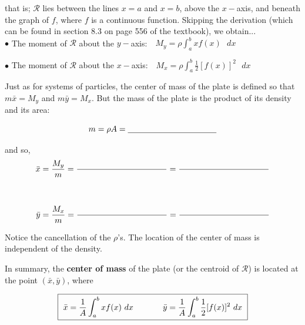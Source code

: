 \documentclass[paper=a4, fontsize=11pt]{scrartcl} %
\numberwithin{equation}{section} %
\numberwithin{figure}{section} %
\numberwithin{table}{section} %
\newcommand{\ds}{\displaystyle}
\begin{document}
that is; $\mathcal{R}$ lies between the lines $x=a$ and $x=b$, above the $x-$axis, and beneath the graph of $f$, where $f$ is a continuous function. Skipping the derivation (which can be found in section 8.3 on page 556 of the textbook), we obtain...\\

$\bullet$ The moment of $\mathcal{R}$ about the $y-$axis: \quad $\boxed{\text{ }M_y = \rho\ds\int_a^b x f(x) \text{ }dx \text{ }}$\\
\indent

$\bullet$ The moment of $\mathcal{R}$ about the $x-$axis: \quad $\boxed{\text{ }M_x = \rho\ds\int_a^b \ds\frac{1}{2}[f(x)]^2\text{ }dx \text{ }}$\\
\indent

Just as for systems of particles, the center of mass of the plate is defined so that $m\bar{x} = M_y$ and $m\bar{y} = M_x$. But the mass of the plate is the product of its density and its area:

\[m = \rho A = \underline{\hspace{1.5in}}\]

and so,\\

\begin{align*}
\bar{x} &= \ds\frac{M_y}{m} = \ds\frac{\hspace{1.5in}}{\text{ }} = \ds\frac{\hspace{1.5in}}{\text{ }}\\
\text{ }\\
\text{ }\\
\bar{y} &= \ds\frac{M_x}{m} = \ds\frac{\hspace{1.5in}}{\text{ }} = \ds\frac{\hspace{1.5in}}{\text{ }}\\
\end{align*}
\indent

Notice the cancellation of the $\rho$'s. The location of the center of mass is independent of the density. \\
\indent

In summary, the \textbf{center of mass} of the plate (or the centroid of $\mathcal{R}$) is located at the point $(\bar{x},\bar{y})$, where

\[\boxed{\text{ } \bar{x} = \ds\frac{1}{A}\ds\int_a^b x f(x)\text{ }dx \hspace{0.5in} \bar{y} = \ds\frac{1}{A}\ds\int_a^b\ds\frac{1}{2}[f(x)]^2 \text{ } dx\text{ }}\]
\indent\\
\end{document}
